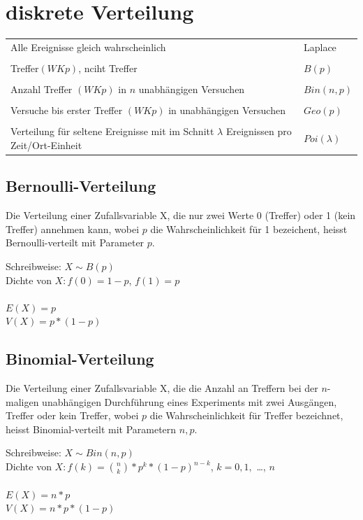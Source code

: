 \documentclass[10pt]{article}
\newtheorem[M]{definition}{Def.}
\newtheorem[M]{satz}{Satz}
\numberwithin{equation}{section}
\begin{document}
\section{diskrete Verteilung}
\begin{tabular}{l l}
	Alle Ereignisse gleich wahrscheinlich & Laplace \\
	\\
	Treffer$(WK p)$, nciht Treffer & $B(p)$ \\
	\\
	Anzahl Treffer $(WK p)$ in $n$ unabhängigen Versuchen & $Bin(n,p)$ \\
	\\
	Versuche bis erster Treffer $(WK p)$ in unabhängigen Versuchen & $Geo(p)$ \\
	\\
	Verteilung für seltene Ereignisse mit im Schnitt $\lambda$ Ereignissen pro Zeit/Ort-Einheit & $Poi(\lambda)$ \\
\end{tabular}

\subsection{Bernoulli-Verteilung}
\begin{definition}
Die Verteilung einer Zufallsvariable X, die nur zwei Werte 0 (Treffer) oder 1 (kein Treffer) annehmen kann, wobei $p$ die Wahrscheinlichkeit für 1 bezeichent, heisst Bernoulli-verteilt mit Parameter $p$. \\
\end{definition}
Schreibweise: $X \sim B(p)$ \\
Dichte von $X : f(0) = 1 - p$, $f(1) = p$ \\
\\
$E(X) = p$ \\
$V(X) = p*(1-p)$ \\

\subsection{Binomial-Verteilung}
\begin{definition}
Die Verteilung einer Zufallsvariable X, die die Anzahl an Treffern bei der $n$-maligen unabhängigen Durchführung eines Experiments mit zwei Ausgängen, Treffer oder kein Treffer, wobei $p$ die Wahrscheinlichkeit für Treffer bezeichnet, heisst Binomial-verteilt mit Parametern $n,p$. \\
\end{definition}
Schreibweise: $X \sim Bin(n,p)$ \\
Dichte von $X : f(k) = \binom{n}{k} * p^k * (1-p)^{n-k}$, $k=0,1,$ \dots, $n$ \\
\\
$E(X) = n*p$ \\
$V(X) = n*p*(1-p)$ \\
\end{document}

